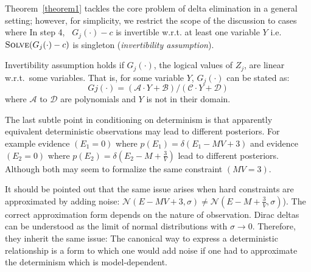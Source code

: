 \documentclass{article}
\newcommand{\bvec}[1]{\textbf{#1}}
\newcommand{\pr}{p}
\begin{document}
Theorem~\ref{theorem1} tackles the core problem of delta elimination in a general setting; however, 
for simplicity, we restrict the scope of the discussion to cases where  
In step 4, \ $G_j(\cdot) - c$ is invertible w.r.t. at least one variable $Y$ 
i.e.\ $\textsc{Solve}(G_j(\cdot)-c)$ is singleton (\emph{invertibility assumption}).{
Invertibility assumption holds
if $G_j(\cdot)$, the logical values of $Z_j$, are linear w.r.t.\ some variables. 
That is, for some variable $Y$, $G_j(\cdot)$ can be stated as: 
{\footnotesize
$$
Gj(\cdot) = 
{(\mathcal{A} \cdot Y + \mathcal{B})}/{(\mathcal{C} \cdot Y + \mathcal{D})}
$$}
\!\!where $\mathcal{A}$ to $\mathcal{D}$ are polynomials and $Y$ is not in their domain.

%






{\color{red}
The last subtle point in conditioning on determinism is that apparently equivalent deterministic observations may lead to different posteriors. For example evidence $(E_1 = 0)$ where $\pr(E_1)= \delta(E_1 - M V + 3)$ and 
evidence $(E_2 = 0)$ where $\pr(E_2) = \delta(E_2 - M + \frac{3}{V})$ lead to different posteriors. 
Although both may seem to formalize the same constraint $(MV = 3)$.

It should be pointed out that the same issue arises when hard constraints are approximated by adding noise:
$\mathcal{N}(E - MV + 3, \sigma) \neq \mathcal{N}(E -M + \frac{3}{V}, \sigma)$).
The correct approximation form depends on the nature of observation.
Dirac deltas can be understood as the limit of normal distributions with $\sigma \rightarrow 0$.
Therefore, they inherit the same issue: 
The canonical way to express a deterministic relationship is a form to which one would add noise if one had to approximate the determinism which is model-dependent. 
  
}}
\end{document}
